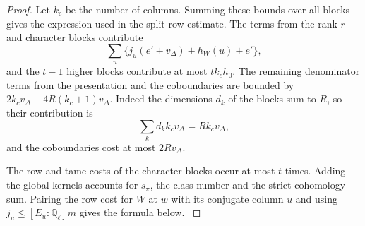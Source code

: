 \begin{proof}
Let \(k_c\) be the number of columns. Summing these
bounds over all blocks gives the expression used in
the split-row estimate. The terms from the rank-\(r\)
and character blocks contribute
\[
 \sum_u\{j_u(e'+v_\Delta)+h_W(u)+e'\},
\]
and the \(t-1\) higher blocks contribute at most
\(tk_ch_0\). The remaining denominator terms from
the presentation and the coboundaries are bounded by
\(2k_cv_\Delta+4R(k_c+1)v_\Delta\). Indeed the dimensions \(d_k\) of the blocks sum to \(R\), so their contribution is
\[
 \sum_k d_k k_c v_\Delta=R k_c v_\Delta,
\]
and the coboundaries cost at most \(2Rv_\Delta\).

The row and tame costs of the
character blocks occur at most \(t\) times. Adding the
global kernels accounts for \(s_\pi\), the class
number and the strict cohomology sum. Pairing the row
cost for \(W\) at \(w\) with its conjugate column
\(u\) and using \(j_u\le [E_u:\mathbb Q_\ell]m\)
gives the formula below.
\label{cor:congruence-determinant-4}
\end{proof}
